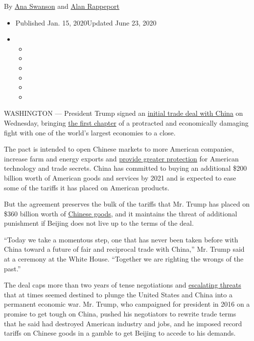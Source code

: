 By \href{https://www.nytimes.com/by/ana-swanson}{Ana Swanson} and
\href{https://www.nytimes.com/by/alan-rappeport}{Alan Rappeport}

\begin{itemize}
\item
  Published Jan. 15, 2020Updated June 23, 2020
\item
  \begin{itemize}
  \item
  \item
  \item
  \item
  \item
  \item
  \end{itemize}
\end{itemize}

WASHINGTON --- President Trump signed an
\href{https://www.nytimes.com/2020/06/23/business/economy/trump-navarro-china-trade-deal.html}{initial
trade deal with China} on Wednesday, bringing
\href{https://www.nytimes.com/2020/01/15/upshot/china-us-trade-peace.html}{the
first chapter} of a protracted and economically damaging fight with one
of the world's largest economies to a close.

The pact is intended to open Chinese markets to more American companies,
increase farm and energy exports and
\href{https://www.nytimes.com/2020/01/14/business/economy/trump-china-trade-deal.html}{provide
greater protection} for American technology and trade secrets. China has
committed to buying an additional \$200 billion worth of American goods
and services by 2021 and is expected to ease some of the tariffs it has
placed on American products.

But the agreement preserves the bulk of the tariffs that Mr. Trump has
placed on \$360 billion worth of
\href{https://www.nytimes.com/2018/08/21/business/economy/trump-china-tariffs-consumers.html}{Chinese
goods}, and it maintains the threat of additional punishment if Beijing
does not live up to the terms of the deal.

``Today we take a momentous step, one that has never been taken before
with China toward a future of fair and reciprocal trade with China,''
Mr. Trump said at a ceremony at the White House. ``Together we are
righting the wrongs of the past.''

The deal caps more than two years of tense negotiations and
\href{https://www.nytimes.com/2019/08/23/business/china-tariffs-trump.html}{escalating
threats} that at times seemed destined to plunge the United States and
China into a permanent economic war. Mr. Trump, who campaigned for
president in 2016 on a promise to get tough on China, pushed his
negotiators to rewrite trade terms that he said had destroyed American
industry and jobs, and he imposed record tariffs on Chinese goods in a
gamble to get Beijing to accede to his demands.

